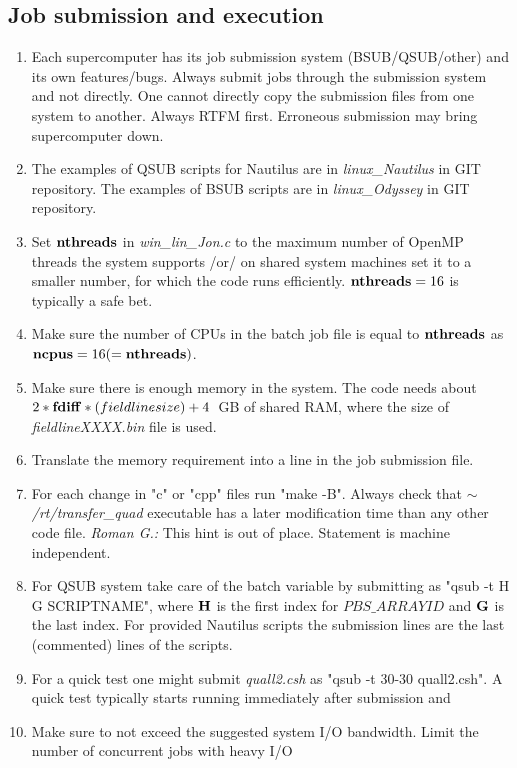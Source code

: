 \documentclass{emulateapj}
\newcommand{\rg}[1]{\color{blue}\textit{Roman G.:} #1\color{black}}
\begin{document}
\subsection{Job submission and execution}
\begin{enumerate}
\item{Each supercomputer has its job submission system
  (BSUB/QSUB/other) and its own features/bugs. Always submit jobs
  through the submission system and not directly.  One cannot directly
  copy the submission files from one system to another. Always RTFM
  first. Erroneous submission may bring supercomputer down.}
\item{The examples of QSUB scripts for Nautilus are in
  \textit{linux\_Nautilus} in GIT repository. The examples of BSUB
  scripts are in \textit{linux\_Odyssey} in GIT repository.}
\item{Set ${\bf nthreads}$ in \textit{win\_lin\_Jon.c} to the maximum
  number of OpenMP threads the system supports /or/ on shared system
  machines set it to a smaller number, for which the code runs
  efficiently. ${\bf nthreads}=16$ is typically a safe bet.}
\item{Make sure the number of CPUs in the batch job file is equal to
  ${\bf nthreads}$ as ${\bf ncpus}=16(={\bf nthreads})$.}
\item{Make sure there is enough memory in the system. The code needs
  about $2*{\bf fdiff}*(fieldline size)+4$~GB of shared RAM, where the
  size of \textit{fieldlineXXXX.bin} file is used.}
\item{Translate the memory requirement into a line in the job
  submission file.}
\item{For each change in "c" or "cpp" files run "make -B". Always
  check that \textit{$\sim$/rt/transfer\_quad} executable has a later
  modification time than any other code file. \rg{This hint is out of
    place. Statement is machine independent.}}
\item{For QSUB system take care of the batch variable by submitting as
  "qsub -t H G SCRIPTNAME", where $\bf H$ is the first index for
  $PBS\_ARRAYID$ and $\bf G$ is the last index.  For provided Nautilus
  scripts the submission lines are the last (commented) lines of the
  scripts.}
\item{For a quick test one might submit \textit{quall2.csh} as "qsub
  -t 30-30 quall2.csh". A quick test typically starts running
  immediately after submission and }
\item{Make sure to not exceed the suggested system I/O
  bandwidth. Limit the number of concurrent jobs with heavy I/O
}
\end{enumerate}
\end{document}
